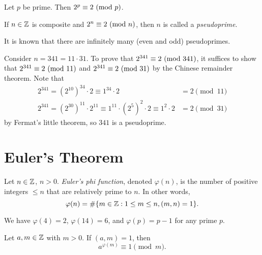 \begin{corollary}
  Let $p$ be prime. Then
  $2^p \equiv 2 \ (\mathrm{mod}\ p)$.
\end{corollary}

\begin{definition}
  If $n \in \mathbb{Z}$ is composite and
  $2^n \equiv 2 \ (\mathrm{mod}\ n)$,
  then $n$ is called a \emph{pseudoprime}.
\end{definition}

\begin{remark}
  It is known that there are infinitely
  many (even and odd) pseudoprimes.
\end{remark}

\begin{example}
  Consider $n = 341 = 11 \cdot 31$.
  To prove that $2^{341} \equiv 2 \ (\mathrm{mod}\ 341)$,
  it suffices to show that
  $2^{341} \equiv 2 \ (\mathrm{mod}\ 11)$
  and $2^{341} \equiv 2 \ (\mathrm{mod}\ 31)$
  by the Chinese remainder theorem.
  Note that
  \begin{align*}
    2^{341}
    = (2^{10})^{34} \cdot 2 \equiv
    1^{34} \cdot 2 &= 2 \pmod{11} \\
    2^{341} = (2^{30})^{11} \cdot 2^{11}
    \equiv 1^{11} \cdot (2^5)^2 \cdot 2
    \equiv 1^2 \cdot 2 &= 2 \pmod{31}
  \end{align*}
  by Fermat's little theorem, so
  $341$ is a pseudoprime.
\end{example}

\section{Euler's Theorem}

\begin{definition}
  Let $n \in \mathbb{Z}$, $n > 0$.
  \emph{Euler's phi function}, denoted
  $\varphi(n)$, is the number of
  positive integers $\le n$ that are
  relatively prime to $n$. In other words,
  \[
    \varphi(n)
    = \#\{m \in \mathbb{Z} : 1 \le m \le n, (m, n) = 1\}.
  \]
\end{definition}

\begin{example}
  We have $\varphi(4) = 2$,
  $\varphi(14) = 6$, and
  $\varphi(p) = p - 1$ for any prime $p$.
\end{example}

\begin{theorem}
  Let $a, m \in \mathbb{Z}$ with $m > 0$. If
  $(a, m) = 1$, then
  \[
    a^{\varphi(m)} \equiv 1 \pmod{m}.
  \]
\end{theorem}


